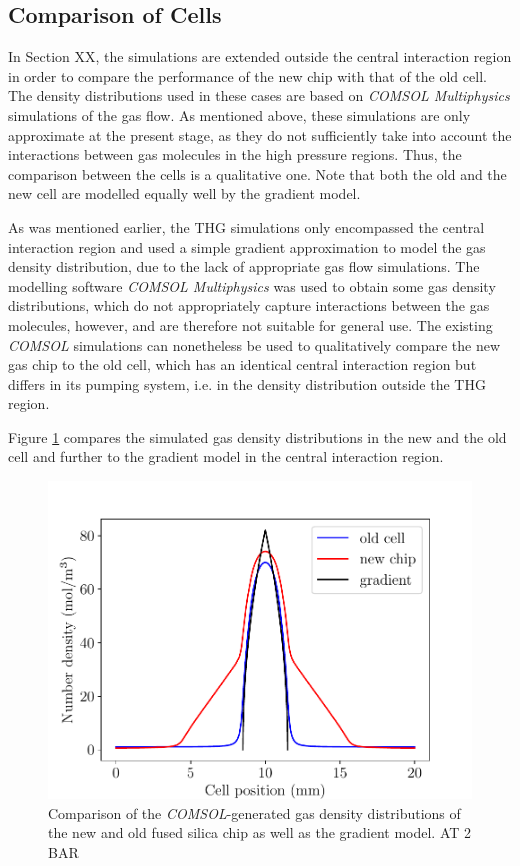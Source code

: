 \documentclass[a4paper]{jpconf}
\begin{document}
\subsection{Comparison of Cells}
In Section XX, the simulations are extended outside the central interaction region in order to compare the performance of the new chip with that of the old cell. The density distributions used in these cases are based on \textit{COMSOL Multiphysics} simulations of the gas flow. As mentioned above, these simulations are only approximate at the present stage, as they do not sufficiently take into account the interactions between gas molecules in the high pressure regions. Thus, the comparison between the cells is a qualitative one. Note that both the old and the new cell are modelled equally well by the gradient model. \par 
As was mentioned earlier, the THG simulations only encompassed the central interaction region and used a simple gradient approximation to model the gas density distribution, due to the lack of appropriate gas flow simulations. The modelling software \textit{COMSOL Multiphysics} was used to obtain some gas density distributions, which do not appropriately capture interactions between the gas molecules, however, and are therefore not suitable for general use. The existing \textit{COMSOL} simulations can nonetheless be used to qualitatively compare the new gas chip to the old cell, which has an identical central interaction region but differs in its pumping system, i.e. in the density distribution outside the THG region. \par 
Figure \ref{im:dens} compares the simulated gas density distributions in the new and the old cell and further to the gradient model in the central interaction region. 
\begin{figure}[h]
\centering
\includegraphics[width=0.5 \textwidth]{im/old_new_comp}
\caption{Comparison of the \textit{COMSOL}-generated gas density distributions of the new and old fused silica chip as well as the gradient model. AT 2 BAR}\label{im:dens}
\end{figure}
\end{document}
